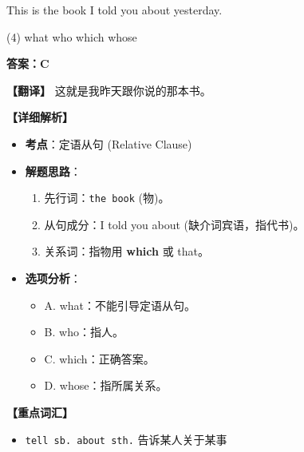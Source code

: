 \documentclass[11pt, a4paper]{article}
\newcommand{\analysis}[4]{
    \begin{solutionbox}
        \textbf{答案：#1}
        
        \textbf{【翻译】} #2
        
        \textbf{【详细解析】}
        #3
        
        \textbf{【重点词汇】}
        #4
    \end{solutionbox}
}
\newcommand{\blank}{\underline{\hspace{1.5cm}}}
\begin{document}
\begin{questions}
    \item This is the book \blank I told you about yesterday.
    \begin{tasks}(4)
        \task what \task who \task which \task whose
    \end{tasks}
    \analysis{C}{这就是我昨天跟你说的那本书。}{
        \begin{itemize}
            \item \textbf{考点}：定语从句 (Relative Clause)
            \item \textbf{解题思路}：
                \begin{enumerate}
                    \item 先行词：\texttt{the book} (物)。
                    \item 从句成分：I told you about \blank (缺介词宾语，指代书)。
                    \item 关系词：指物用 \textbf{which} 或 that。
                \end{enumerate}
            \item \textbf{选项分析}：
                \begin{itemize}
                    \item A. what：不能引导定语从句。
                    \item B. who：指人。
                    \item C. which：正确答案。
                    \item D. whose：指所属关系。
                \end{itemize}
        \end{itemize}
    }{
        \begin{itemize}
            \item \texttt{tell sb. about sth.} 告诉某人关于某事
        \end{itemize}
    }


\end{questions}
\end{document}
